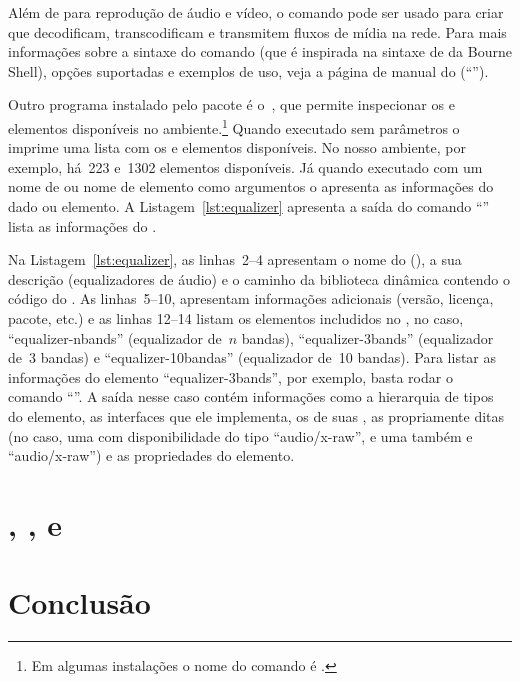 \documentclass{SBCbookchapter}
\begin{document}
Além de  para reprodução de áudio e vídeo, o comando
 pode ser usado para criar  que decodificam,
transcodificam e transmitem fluxos de mídia na rede.  Para mais informações
sobre a sintaxe do comando (que é inspirada na sintaxe de  da
Bourne Shell), opções suportadas e exemplos de uso, veja a página de manual
do  (``'').

Outro programa instalado pelo pacote  é o~,
que permite inspecionar os  e elementos disponíveis no
ambiente.\footnote{Em algumas instalações o nome do comando é
  .}  Quando executado sem parâmetros o 
imprime uma lista com os  e elementos disponíveis.  No nosso
ambiente, por exemplo, há~223  e~1302 elementos disponíveis.  Já
quando executado com um nome de  ou nome de elemento como
argumentos o  apresenta as informações do dado 
ou elemento.  A Listagem~\ref{lst:equalizer} apresenta a saída do comando
``'' lista as informações do 
.



Na Listagem~\ref{lst:equalizer}, as linhas~2--4 apresentam o nome do
 (), a sua descrição (equalizadores de áudio) e o
caminho da biblioteca dinâmica contendo o código do .  As
linhas~5--10, apresentam informações adicionais (versão, licença, pacote,
etc.) e as linhas 12--14 listam os elementos includidos no , no
caso, ``equalizer-nbands'' (equalizador de~$n$ bandas), ``equalizer-3bands''
(equalizador de~3 bandas) e ``equalizer-10bandas'' (equalizador de~10
bandas).  Para listar as informações do elemento ``equalizer-3bands'', por
exemplo, basta rodar o comando ``''.
A saída nesse caso contém informações como a hierarquia de tipos do
elemento, as interfaces que ele implementa, os  de suas
, as  propriamente ditas (no caso, uma  com
disponibilidade  do tipo ``audio/x-raw'', e uma 
também  e ``audio/x-raw'') e as propriedades do elemento.




\clearpage



\section{, ,  e~}
\label{sec:ops}





\section{Conclusão}
\label{sec:conclusao}




\end{document}
